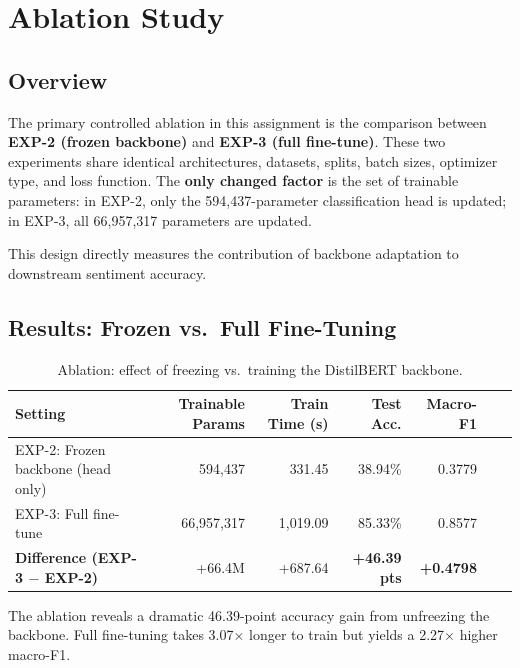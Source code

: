 \section{Ablation Study}
\label{sec:ablation}

\subsection{Overview}

The primary controlled ablation in this assignment is the comparison between \textbf{EXP-2 (frozen backbone)} and \textbf{EXP-3 (full fine-tune)}. These two experiments share identical architectures, datasets, splits, batch sizes, optimizer type, and loss function. The \textbf{only changed factor} is the set of trainable parameters: in EXP-2, only the 594,437-parameter classification head is updated; in EXP-3, all 66,957,317 parameters are updated.

This design directly measures the contribution of backbone adaptation to downstream sentiment accuracy.

\subsection{Results: Frozen vs.\ Full Fine-Tuning}

\begin{table}[H]
    \centering
    \caption{Ablation: effect of freezing vs.\ training the DistilBERT backbone.}
    \label{tab:ablation_frozen}
    \begin{tabularx}{\textwidth}{l r r r r r r}
        \toprule
        \textbf{Setting} & \textbf{Trainable Params} & \textbf{Train Time (s)} & \textbf{Test Acc.} & \textbf{Macro-F1} \\
        \midrule
        EXP-2: Frozen backbone (head only) & 594,437   & 331.45   & 38.94\% & 0.3779 \\
        EXP-3: Full fine-tune              & 66,957,317 & 1,019.09 & 85.33\% & 0.8577 \\
        \midrule
        \textbf{Difference (EXP-3 $-$ EXP-2)} & +66.4M & +687.64 & \textbf{+46.39 pts} & \textbf{+0.4798} \\
        \bottomrule
    \end{tabularx}
\end{table}

The ablation reveals a dramatic 46.39-point accuracy gain from unfreezing the backbone. Full fine-tuning takes 3.07$\times$ longer to train but yields a 2.27$\times$ higher macro-F1.

